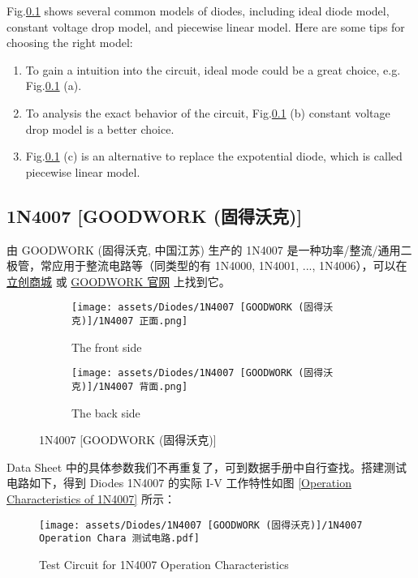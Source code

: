 \documentclass[UTF8]{report}
\begin{document}
Fig.\ref{} shows several common models of diodes, including ideal diode model, constant voltage drop model, and piecewise linear model. Here are some tips for choosing the right model:
\begin{enumerate}
\item To gain a intuition into the circuit, ideal mode could be a great choice, e.g. Fig.\ref{} (a).
\item To analysis the exact behavior of the circuit, Fig.\ref{} (b) constant voltage drop model is a better choice. 
\item Fig.\ref{} (c) is an alternative to replace the expotential diode, which is called piecewise linear model.

\end{enumerate}


\subsection{1N4007 [GOODWORK (固得沃克)]}
由 GOODWORK (固得沃克, 中国江苏) 生产的 1N4007 是一种功率/整流/通用二极管，常应用于整流电路等（同类型的有 1N4000, 1N4001, ..., 1N4006），可以在 \href{https://item.szlcsc.com/3428711.html}{立创商城} 或 \href{http://www.gk-goodwork.com/cn/product/1n4007.html}{GOODWORK 官网} 上找到它。
\begin{figure}[H]\centering
\begin{subfigure}[b]{0.5\columnwidth}\centering
    \texttt{[image: assets/Diodes/1N4007 [GOODWORK (固得沃克)]/1N4007 正面.png]}
    \caption{The front side}
\end{subfigure}\hfill
\begin{subfigure}[b]{0.5\columnwidth}\centering
    \texttt{[image: assets/Diodes/1N4007 [GOODWORK (固得沃克)]/1N4007 背面.png]}
    \caption{The back side}
\end{subfigure}
\caption{1N4007 [GOODWORK (固得沃克)]}
\end{figure}

Data Sheet 中的具体参数我们不再重复了，可到数据手册中自行查找。搭建测试电路如下，得到 Diodes 1N4007 的实际 I-V 工作特性如图 \ref{Operation Characteristics of 1N4007} 所示：
\begin{figure}[H]\centering
    \texttt{[image: assets/Diodes/1N4007 [GOODWORK (固得沃克)]/1N4007 Operation Chara 测试电路.pdf]}
    \caption{Test Circuit for 1N4007 Operation Characteristics}
\end{figure}
\end{document}
